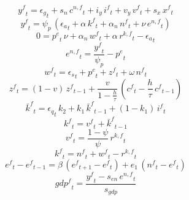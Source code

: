 \begin{dmath}
{{y^{f}}}_{t}={{\epsilon_{g}}}_{t}+{{s_{n}}}\, {{c^{n,f}}}_{t}+{{i_{y}}}\, {{i^{f}}}_{t}+{{v_{y}}}\, {{v^{f}}}_{t}+{{s_{x}}}\, {{x^{f}}}_{t}
\end{dmath}
\begin{dmath}
{{y^{f}}}_{t}={{\psi_{p}}}\, \left({{\epsilon_{a}}}_{t}+{{\alpha}}\, {{k^{f}}}_{t}+{{\alpha_{n}}}\, {{n^{f}}}_{t}+{{\nu}}\, {{e^{n,f}}}_{t}\right)
\end{dmath}
\begin{dmath}
0={{p^{e}}}_{t}\, {{\nu}}+{{\alpha_{n}}}\, {{w^{f}}}_{t}+{{\alpha}}\, {{r^{k,f}}}_{t}-{{\epsilon_{a}}}_{t}
\end{dmath}
\begin{dmath}
{{e^{n,f}}}_{t}=\frac{{{y^{f}}}_{t}}{{{\psi_{p}}}}-{{p^{e}}}_{t}
\end{dmath}
\begin{dmath}
{{w^{f}}}_{t}={{\epsilon_{s}}}_{t}+{{p^{c}}}_{t}+{{z^{f}}}_{t}+{{\omega}}\, {{n^{f}}}_{t}
\end{dmath}
\begin{dmath}
{{z^{f}}}_{t}=\left(1-{{v}}\right)\, {{z^{f}}}_{t-1}+\frac{{{v}}}{1-\frac{{{h}}}{{{\tau}}}}\, \left({{c^{f}}}_{t}-\frac{{{h}}}{{{\tau}}}\, {{c^{f}}}_{t-1}\right)
\end{dmath}
\begin{dmath}
{{\bar{k}^{f}}}_{t}={{\epsilon_{q}}}_{t}\, {{k_{2}}}+{{k_{1}}}\, {{\bar{k}^{f}}}_{t-1}+\left(1-{{k_{1}}}\right)\, {{i^{f}}}_{t}
\end{dmath}
\begin{dmath}
{{k^{f}}}_{t}={{v^{f}}}_{t}+{{\bar{k}^{f}}}_{t-1}
\end{dmath}
\begin{dmath}
{{v^{f}}}_{t}=\frac{1-{{\psi}}}{{{\psi}}}\, {{r^{k,f}}}_{t}
\end{dmath}
\begin{dmath}
{{k^{f}}}_{t}={{n^{f}}}_{t}+{{w^{f}}}_{t}-{{r^{k,f}}}_{t}
\end{dmath}
\begin{dmath}
{{e^{f}}}_{t}-{{e^{f}}}_{t-1}={{\beta}}\, \left({{e^{f}}}_{t+1}-{{e^{f}}}_{t}\right)+{{e_{1}}}\, \left({{n^{f}}}_{t}-{{e^{f}}}_{t}\right)
\end{dmath}
\begin{dmath}
{{gdp^{f}}}_{t}=\frac{{{y^{f}}}_{t}-{{s_{en}}}\, {{e^{n,f}}}_{t}}{{{s_{gdp}}}}
\end{dmath}
